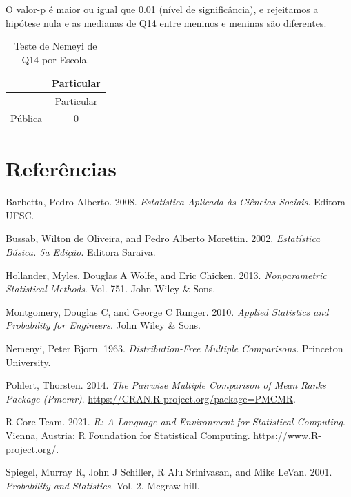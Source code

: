 \documentclass[]{article}
\begin{document}
O valor-p é maior ou igual que 0.01 (nível de significância), e rejeitamos a hipótese nula e as medianas de Q14 entre meninos e meninas são diferentes.

\begin{longtable}[]{@{}lc@{}}
\caption{\label{tab:unnamed-chunk-61}Teste de Nemeyi de Q14 por Escola.}\tabularnewline
\toprule
& Particular\tabularnewline
\midrule
\endfirsthead
\toprule
& Particular\tabularnewline
\midrule
\endhead
Pública & 0\tabularnewline
\bottomrule
\end{longtable}

\cleardoublepage

\cleardoublepage

\hypertarget{referuxeancias}{%
\section*{Referências}\label{referuxeancias}}

\hypertarget{refs}{}
\leavevmode\hypertarget{ref-barbetta2008estatistica}{}%
Barbetta, Pedro Alberto. 2008. \emph{Estatística Aplicada às Ciências Sociais}. Editora UFSC.

\leavevmode\hypertarget{ref-bussab2002estatistica}{}%
Bussab, Wilton de Oliveira, and Pedro Alberto Morettin. 2002. \emph{Estatística Básica. 5a Edição}. Editora Saraiva.

\leavevmode\hypertarget{ref-hollander2013nonparametric}{}%
Hollander, Myles, Douglas A Wolfe, and Eric Chicken. 2013. \emph{Nonparametric Statistical Methods}. Vol. 751. John Wiley \& Sons.

\leavevmode\hypertarget{ref-montgomery2010applied}{}%
Montgomery, Douglas C, and George C Runger. 2010. \emph{Applied Statistics and Probability for Engineers}. John Wiley \& Sons.

\leavevmode\hypertarget{ref-nemenyi1963distribution}{}%
Nemenyi, Peter Bjorn. 1963. \emph{Distribution-Free Multiple Comparisons.} Princeton University.

\leavevmode\hypertarget{ref-PMCMR}{}%
Pohlert, Thorsten. 2014. \emph{The Pairwise Multiple Comparison of Mean Ranks Package (Pmcmr)}. \url{https://CRAN.R-project.org/package=PMCMR}.

\leavevmode\hypertarget{ref-Rlang}{}%
R Core Team. 2021. \emph{R: A Language and Environment for Statistical Computing}. Vienna, Austria: R Foundation for Statistical Computing. \url{https://www.R-project.org/}.

\leavevmode\hypertarget{ref-spiegel2001probability}{}%
Spiegel, Murray R, John J Schiller, R Alu Srinivasan, and Mike LeVan. 2001. \emph{Probability and Statistics}. Vol. 2. Mcgraw-hill.
\end{document}
